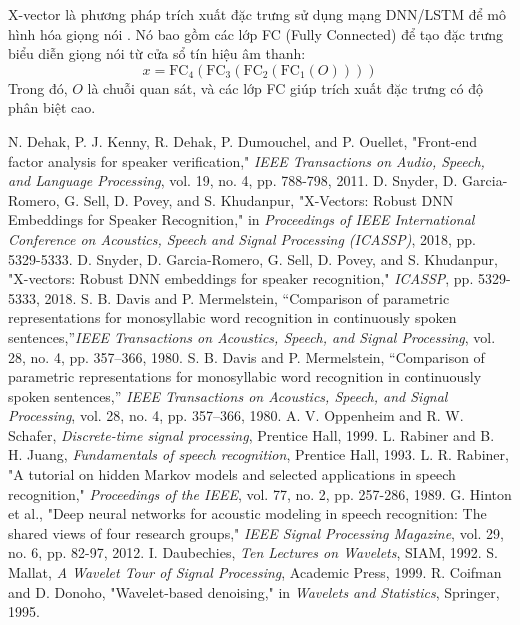 \documentclass{article}
\begin{document}
X-vector là phương pháp trích xuất đặc trưng sử dụng mạng DNN/LSTM để mô hình hóa giọng nói \cite{Snyder2018}. Nó bao gồm các lớp FC (Fully Connected) để tạo đặc trưng biểu diễn giọng nói từ cửa sổ tín hiệu âm thanh:
\begin{equation}
    x = \text{FC}_4(\text{FC}_3(\text{FC}_2(\text{FC}_1(O))))
\end{equation}
Trong đó, $O$ là chuỗi quan sát, và các lớp FC giúp trích xuất đặc trưng có độ phân biệt cao.


\begin{thebibliography}{9}
     N. Dehak, P. J. Kenny, R. Dehak, P. Dumouchel, and P. Ouellet, "Front-end factor analysis for speaker verification," \textit{IEEE Transactions on Audio, Speech, and Language Processing}, vol. 19, no. 4, pp. 788-798, 2011.
     D. Snyder, D. Garcia-Romero, G. Sell, D. Povey, and S. Khudanpur, "X-Vectors: Robust DNN Embeddings for Speaker Recognition," in \textit{Proceedings of IEEE International Conference on Acoustics, Speech and Signal Processing (ICASSP)}, 2018, pp. 5329-5333.
     D. Snyder, D. Garcia-Romero, G. Sell, D. Povey, and S. Khudanpur, "X-vectors: Robust DNN embeddings for speaker recognition," \textit{ICASSP}, pp. 5329-5333, 2018.
     S. B. Davis and P. Mermelstein, \textquotedblleft Comparison of parametric representations for monosyllabic word recognition in continuously spoken sentences,\textquotedblright \emph{IEEE Transactions on Acoustics, Speech, and Signal Processing}, vol. 28, no. 4, pp. 357–366, 1980.
     S. B. Davis and P. Mermelstein, ``Comparison of parametric representations for monosyllabic word recognition in continuously spoken sentences,'' \emph{IEEE Transactions on Acoustics, Speech, and Signal Processing}, vol. 28, no. 4, pp. 357–366, 1980.
     A. V. Oppenheim and R. W. Schafer, \emph{Discrete-time signal processing}, Prentice Hall, 1999.
     L. Rabiner and B. H. Juang, \emph{Fundamentals of speech recognition}, Prentice Hall, 1993.
     L. R. Rabiner, "A tutorial on hidden Markov models and selected applications in speech recognition," \textit{Proceedings of the IEEE}, vol. 77, no. 2, pp. 257-286, 1989.
     G. Hinton et al., "Deep neural networks for acoustic modeling in speech recognition: The shared views of four research groups," \textit{IEEE Signal Processing Magazine}, vol. 29, no. 6, pp. 82-97, 2012.
     I. Daubechies, \textit{Ten Lectures on Wavelets}, SIAM, 1992.
     S. Mallat, \textit{A Wavelet Tour of Signal Processing}, Academic Press, 1999.
     R. Coifman and D. Donoho, "Wavelet-based denoising," in \textit{Wavelets and Statistics}, Springer, 1995.
\end{thebibliography}
\end{document}
